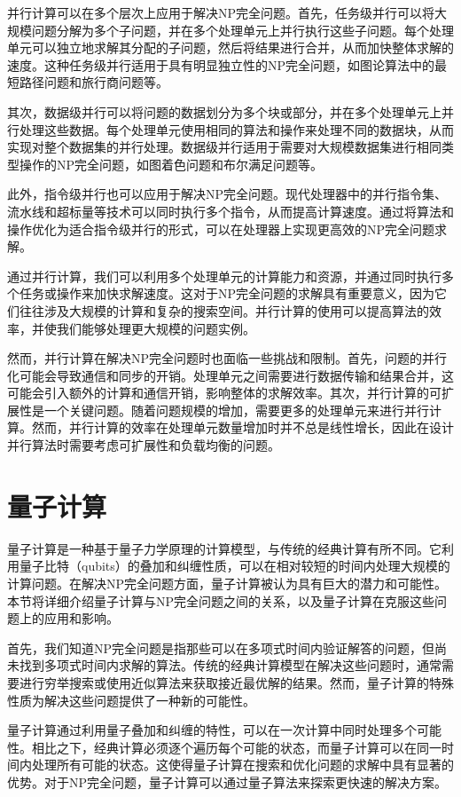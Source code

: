 \documentclass[UTF8,openany,zihao=5]{ctexbook}
\begin{document}
并行计算可以在多个层次上应用于解决NP完全问题。首先，任务级并行可以将大规模问题分解为多个子问题，并在多个处理单元上并行执行这些子问题。每个处理单元可以独立地求解其分配的子问题，然后将结果进行合并，从而加快整体求解的速度。这种任务级并行适用于具有明显独立性的NP完全问题，如图论算法中的最短路径问题和旅行商问题等。

其次，数据级并行可以将问题的数据划分为多个块或部分，并在多个处理单元上并行处理这些数据。每个处理单元使用相同的算法和操作来处理不同的数据块，从而实现对整个数据集的并行处理。数据级并行适用于需要对大规模数据集进行相同类型操作的NP完全问题，如图着色问题和布尔满足问题等。

此外，指令级并行也可以应用于解决NP完全问题。现代处理器中的并行指令集、流水线和超标量等技术可以同时执行多个指令，从而提高计算速度。通过将算法和操作优化为适合指令级并行的形式，可以在处理器上实现更高效的NP完全问题求解。

通过并行计算，我们可以利用多个处理单元的计算能力和资源，并通过同时执行多个任务或操作来加快求解速度。这对于NP完全问题的求解具有重要意义，因为它们往往涉及大规模的计算和复杂的搜索空间。并行计算的使用可以提高算法的效率，并使我们能够处理更大规模的问题实例。

然而，并行计算在解决NP完全问题时也面临一些挑战和限制。首先，问题的并行化可能会导致通信和同步的开销。处理单元之间需要进行数据传输和结果合并，这可能会引入额外的计算和通信开销，影响整体的求解效率。其次，并行计算的可扩展性是一个关键问题。随着问题规模的增加，需要更多的处理单元来进行并行计算。然而，并行计算的效率在处理单元数量增加时并不总是线性增长，因此在设计并行算法时需要考虑可扩展性和负载均衡的问题。

\section{量子计算}

量子计算是一种基于量子力学原理的计算模型，与传统的经典计算有所不同。它利用量子比特（qubits）的叠加和纠缠性质，可以在相对较短的时间内处理大规模的计算问题。在解决NP完全问题方面，量子计算被认为具有巨大的潜力和可能性。本节将详细介绍量子计算与NP完全问题之间的关系，以及量子计算在克服这些问题上的应用和影响。

首先，我们知道NP完全问题是指那些可以在多项式时间内验证解答的问题，但尚未找到多项式时间内求解的算法。传统的经典计算模型在解决这些问题时，通常需要进行穷举搜索或使用近似算法来获取接近最优解的结果。然而，量子计算的特殊性质为解决这些问题提供了一种新的可能性。

量子计算通过利用量子叠加和纠缠的特性，可以在一次计算中同时处理多个可能性。相比之下，经典计算必须逐个遍历每个可能的状态，而量子计算可以在同一时间内处理所有可能的状态。这使得量子计算在搜索和优化问题的求解中具有显著的优势。对于NP完全问题，量子计算可以通过量子算法来探索更快速的解决方案。
\end{document}
